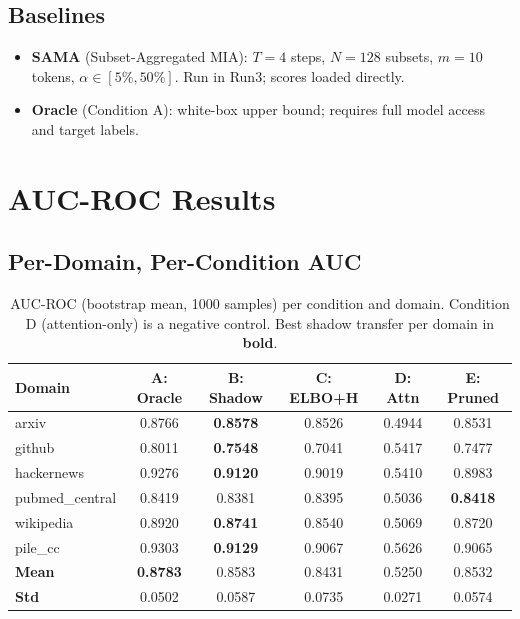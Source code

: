 \documentclass[11pt,a4paper]{article}
\newcommand{\best}[1]{\textbf{#1}}
\begin{document}
\subsection*{Baselines}
\begin{itemize}
  \item \textbf{SAMA} (Subset-Aggregated MIA): $T=4$ steps, $N=128$ subsets, $m=10$ tokens, $\alpha \in [5\%, 50\%]$. Run in Run3; scores loaded directly.
  \item \textbf{Oracle} (Condition A): white-box upper bound; requires full model access and target labels.
\end{itemize}

\section{AUC-ROC Results}

\subsection{Per-Domain, Per-Condition AUC}

\begin{table}[ht]
\centering
\caption{AUC-ROC (bootstrap mean, 1000 samples) per condition and domain. Condition D (attention-only) is a negative control. Best shadow transfer per domain in \textbf{bold}.}
\label{tab:auc_grid}
\begin{tabular}{lccccc}
\toprule
\textbf{Domain} & \textbf{A: Oracle} & \textbf{B: Shadow} & \textbf{C: ELBO+H} & \textbf{D: Attn} & \textbf{E: Pruned} \\
\midrule
arxiv          & 0.8766 & \best{0.8578} & 0.8526 & 0.4944 & 0.8531 \\
github         & 0.8011 & \best{0.7548} & 0.7041 & 0.5417 & 0.7477 \\
hackernews     & 0.9276 & \best{0.9120} & 0.9019 & 0.5410 & 0.8983 \\
pubmed\_central & 0.8419 & 0.8381        & 0.8395 & 0.5036 & \best{0.8418} \\
wikipedia      & 0.8920 & \best{0.8741} & 0.8540 & 0.5069 & 0.8720 \\
pile\_cc        & 0.9303 & \best{0.9129} & 0.9067 & 0.5626 & 0.9065 \\
\midrule
\textbf{Mean}  & \textbf{0.8783} & 0.8583 & 0.8431 & 0.5250 & 0.8532 \\
\textbf{Std}   & 0.0502 & 0.0587 & 0.0735 & 0.0271 & 0.0574 \\
\bottomrule
\end{tabular}
\end{table}
\end{document}
